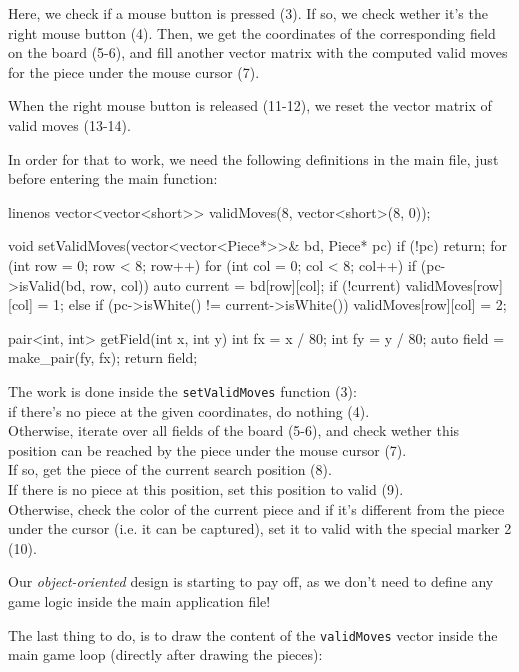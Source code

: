 Here, we check if a mouse button is pressed (3).
If so, we check wether it's the right mouse button (4).
Then, we get the coordinates of the corresponding field on the board (5-6), and
fill another vector matrix with the computed valid moves for the piece under the
mouse cursor (7).

When the right mouse button is released (11-12), we reset the vector matrix of
valid moves (13-14).

In order for that to work, we need the following definitions in the main file,
just before entering the main function:

\begin{cpp*}{linenos}
vector<vector<short>> validMoves(8, vector<short>(8, 0));

void setValidMoves(vector<vector<Piece*>>& bd, Piece* pc) {
  if (!pc) return;
  for (int row = 0; row < 8; row++) {
    for (int col = 0; col < 8; col++) {
      if (pc->isValid(bd, row, col)) {
        auto current = bd[row][col];
        if (!current) validMoves[row][col] = 1; 
        else if (pc->isWhite() != current->isWhite())
          validMoves[row][col] = 2;
      }
    }
  }
}

pair<int, int> getField(int x, int y) {
  int fx = x / 80;
  int fy = y / 80;
  auto field = make_pair(fy, fx);
  return field;
}

\end{cpp*}

The work is done inside the \texttt{setValidMoves} function (3):\\
if there's no piece at the given coordinates, do nothing (4).\\
Otherwise, iterate over all fields of the board (5-6), and check wether this position can be
reached by the piece under the mouse cursor (7).\\
If so, get the piece of the current search position (8).\\
If there is no piece at this position, set this position to valid (9).\\
Otherwise, check the color of the current piece and if it's different from the piece
under the cursor (i.e. it can be captured), set it to valid with the special marker 2 (10).

Our \emph{object-oriented} design is starting to pay off, as we don't need to define any
game logic inside the main application file!

The last thing to do, is to draw the content of the \texttt{validMoves}
vector inside the main game loop (directly after drawing the pieces):


